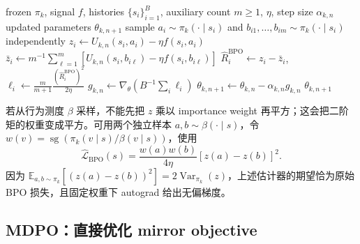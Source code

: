 \begin{algorithm}[ht]
\caption{BPO inner update\\{\small\textit{Semantics: 固定 anchor 下对正向中心化残差求平方损失}}}
\begin{algorithmic}[1]
\Require frozen $\pi_k$, signal $f$, histories $\{s_i\}_{i=1}^{B}$, auxiliary count $m\ge1$, $\eta$, step size $\alpha_{k,n}$
\Ensure updated parameters $\theta_{k,n+1}$
    \State sample $a_i\sim\pi_k(\cdot\mid s_i)$ and $b_{i1},\ldots,b_{im}\sim\pi_k(\cdot\mid s_i)$ independently
    \State $z_i\gets U_{k,n}(s_i,a_i)-\eta f(s_i,a_i)$
    \State $\bar z_i\gets m^{-1}\sum_{\ell=1}^{m}[U_{k,n}(s_i,b_{i\ell})-\eta f(s_i,b_{i\ell})]$
    \State $\widehat R_i^{\mathrm{BPO}}\gets z_i-\bar z_i$, $\ell_i\gets\frac{m}{m+1}\frac{(\widehat R_i^{\mathrm{BPO}})^2}{2\eta}$
\EndFor
\State $g_{k,n}\gets\nabla_\theta(B^{-1}\sum_i\ell_i)$
\State $\theta_{k,n+1}\gets\theta_{k,n}-\alpha_{k,n}g_{k,n}$
\State \Return $\theta_{k,n+1}$
\end{algorithmic}
\end{algorithm}

若从行为测度 $\beta$ 采样，不能先把 $z$ 乘以 importance weight 再平方；这会把二阶矩的权重变成平方。可用两个独立样本 $a,b\sim\beta(\cdot\mid s)$，令 $w(v)=\operatorname{sg}(\pi_k(v\mid s)/\beta(v\mid s))$，使用
\[
\widehat{\mathcal L}_{\mathrm{BPO}}(s)
=\frac{w(a)w(b)}{4\eta}[z(a)-z(b)]^2.
\]
因为 $\mathbb E_{a,b\sim\pi_k}[(z(a)-z(b))^2]=2\operatorname{Var}_{\pi_k}(z)$，上述估计器的期望恰为原始 BPO 损失，且固定权重下 autograd 给出无偏梯度。

\subsection{MDPO：直接优化 mirror objective}
\label{sec:ch2-mdpo-generic}


